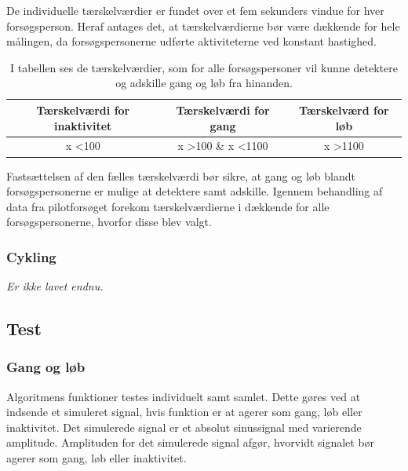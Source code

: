 De individuelle tærskelværdier er fundet over et fem sekunders vindue for hver forsøgsperson. Heraf antages det, at tærskelværdierne bør være dækkende for hele målingen, da forsøgspersonerne udførte aktiviteterne ved konstant hastighed.
\begin{table}[H]
	\centering
	\begin{tabular}{ccc}
		\hline
		\rowcolor[HTML]{C0C0C0} 
		Tærskelværdi for inaktivitet & Tærskelværdi for gang & Tærskelværd for løb \\ \hline
		x \textless 100 & x \textgreater 100 \& x \textless 1100 & x \textgreater 1100 \\ \hline
	\end{tabular}
	\caption{I tabellen ses de tærskelværdier, som for alle forsøgspersoner vil kunne detektere og adskille gang og løb fra hinanden.}
	\label{tab:faelles_taerskel}
\end{table}\vspace{-0.5cm}
Fastsættelsen af den fælles tærskelværdi bør sikre, at gang og løb blandt forsøgspersonerne er mulige at detektere samt adskille. Igennem behandling af data fra pilotforsøget forekom tærskelværdierne i  dækkende for alle forsøgspersonerne, hvorfor disse blev valgt.

\subsubsection{Cykling}
\textit{Er ikke lavet endnu.}

\subsection{Test}
\subsubsection{Gang og løb}
Algoritmens funktioner testes individuelt samt samlet. Dette gøres ved at indsende et simuleret signal, hvis funktion er at agerer som gang, løb eller inaktivitet. Det simulerede signal er et absolut sinussignal med varierende amplitude. Amplituden for det simulerede signal afgør, hvorvidt signalet bør agerer som gang, løb eller inaktivitet.  

